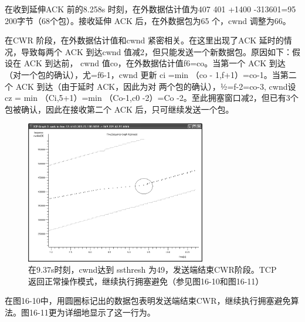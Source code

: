 在收到延伸ACK 前的8.258s 时刻，在外数据估计值为407 401 +1400 -313601=95 200字节（68个包）。接收延伸 ACK 后，在外数据包为65 个，cwnd 调整为66。

在CWR 阶段，在外数据估计值和cwnd 紧密相关。在这里出现了ACK 延时的情况，导致每两个 ACK 到达cwnd 值减2，但只能发送一个新数据包。原因如下：假设在 ACK 到达前，
cwnd 值co，在外数据估计值f6=co。当第一个 ACK 到达（对一个包的确认），尤=f6-1，cwnd 更新 ci =min （co - 1,f+1）=co-1。当第二个 ACK 到达（由于延时 ACK，因此为对
两个包的确认），½=f-2=co-3, cwnd设 cz = min （Ci,5+1）=min （Co-1,c0 -2）=Co -2。至此拥塞窗口减2，但已有3个包被确认，因此在接收第二个 ACK 后，只可继续发送一个包。
\begin{figure}[!htb]
    \centering
	\includegraphics[width=0.7\textwidth]{imgs/16/16-10.png}
	\caption{在9.37s时刻，cwnd达到 ssthresh 为49，发送端结束CWR阶段。TCP 返回正常操作模式，继续执行拥塞避免（参见图16-10和图16-11）}
\end{figure}

在图16-10中，用圆圈标记出的数据包表明发送端结束CWR，继续执行拥塞避免算法。图16-11更为详细地显示了这一行为。

